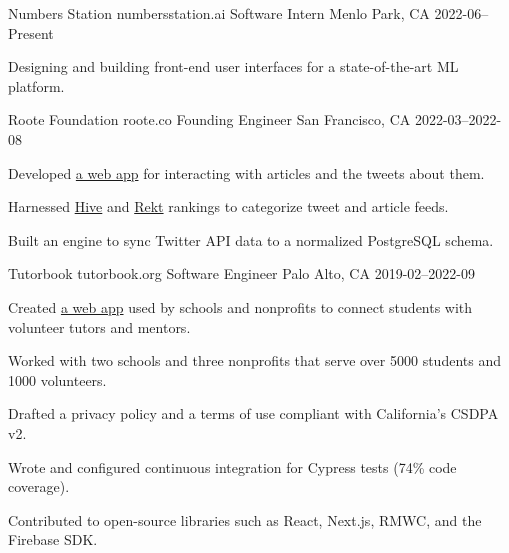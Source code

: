

\begin{cventries}

  \cventry
    {Numbers Station} %
    {numbersstation.ai} %
    {Software Intern} %
    {Menlo Park, CA} %
    {2022-06–Present} %
    {
      \begin{cvitems} %
        \item {Designing and building front-end user interfaces for a state-of-the-art ML platform.}
      \end{cvitems}
    }

  \cventry
    {Roote Foundation} %
    {roote.co} %
    {Founding Engineer} %
    {San Francisco, CA} %
    {2022-03–2022-08} %
    {
      \begin{cvitems} %
        \item {Developed \href{https://github.com/rooteco/tweetscape}{a web app} for interacting with articles and the tweets about them.}
        \item {Harnessed \href{https://hive.one}{Hive} and \href{https://feed.rekt.news/parlor}{Rekt} rankings to categorize tweet and article feeds.}
        \item {Built an engine to sync Twitter API data to a normalized PostgreSQL schema.}
      \end{cvitems}
    }

  \cventry
    {Tutorbook} %
    {tutorbook.org} %
    {Software Engineer} %
    {Palo Alto, CA} %
    {2019-02–2022-09} %
    {
      \begin{cvitems} %
        \item {Created \href{https://github.com/tutorbookapp/tutorbook}{a web app} used by schools and nonprofits to connect students with volunteer tutors and mentors.}
        \item {Worked with two schools and three nonprofits that serve over 5000 students and 1000 volunteers.}
        \item {Drafted a privacy policy and a terms of use compliant with California's CSDPA v2.}
        \item {Wrote and configured continuous integration for Cypress tests (74\% code coverage).}
        \item {Contributed to open-source libraries such as React, Next.js, RMWC, and the Firebase SDK.}
      \end{cvitems}
    }


\end{cventries}
